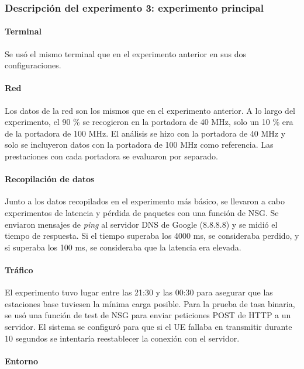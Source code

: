 \documentclass[12pt]{report} %
\begin{document}
\subsubsection{Descripción del experimento 3: experimento principal}

\paragraph{Terminal}

Se usó el mismo terminal que en el experimento anterior en sus dos configuraciones.

\paragraph{Red}

Los datos de la red son los mismos que en el experimento anterior.
A lo largo del experimento, el 90 \% se recogieron en la portadora de 40 MHz, solo un 10 \% era de la portadora de 100 MHz.
El análisis se hizo con la portadora de 40 MHz y solo se incluyeron datos con la portadora de 100 MHz como referencia.
Las prestaciones con cada portadora se evaluaron por separado.

\paragraph{Recopilación de datos}

Junto a los datos recopilados en el experimento más básico,
se llevaron a cabo experimentos de latencia y pérdida de paquetes con una función de NSG.
Se enviaron mensajes de \textit{ping} al servidor DNS de Google (8.8.8.8) y se midió el tiempo de respuesta.
Si el tiempo superaba los 4000 ms, se consideraba perdido, y si superaba los 100 ms, se consideraba que la latencia era elevada.

\paragraph{Tráfico}

El experimento tuvo lugar entre las 21:30 y las 00:30 para asegurar que las estaciones base tuviesen la mínima carga posible.
Para la prueba de tasa binaria, se usó una función de test de NSG para enviar peticiones POST de HTTP a un servidor.
El sistema se configuró para que si el UE fallaba en transmitir durante 10 segundos se intentaría reestablecer la conexión con el servidor.

\paragraph{Entorno}
\end{document}

